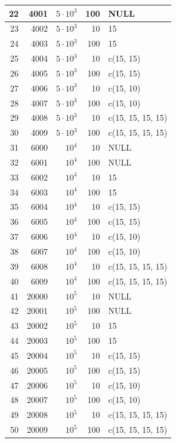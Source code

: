 \documentclass[11pt]{report}
\begin{document}
\begin{longtable}{|r|r|r|r|l|}
\hline
22 & 4001 & $5 \cdot 10^3$ & 100 & NULL \\ 
\hline
23 & 4002 & $5 \cdot 10^3$ & 10 & 15 \\ 
\hline
24 & 4003 & $5 \cdot 10^3$ & 100 & 15 \\ 
\hline
25 & 4004 & $5 \cdot 10^3$ & 10 & c(15, 15) \\ 
\hline
26 & 4005 & $5 \cdot 10^3$ & 100 & c(15, 15) \\ 
\hline
27 & 4006 & $5 \cdot 10^3$ & 10 & c(15, 10) \\ 
\hline
28 & 4007 & $5 \cdot 10^3$ & 100 & c(15, 10) \\ 
\hline
29 & 4008 & $5 \cdot 10^3$ & 10 & c(15, 15, 15, 15) \\
\hline
30 & 4009 & $5 \cdot 10^3$ & 100 & c(15, 15, 15, 15) \\ 
\hline
\hline
31 & 6000 & $10^4$ & 10 & NULL \\ 
\hline
32 & 6001 & $10^4$ & 100 & NULL \\ 
\hline
33 & 6002 & $10^4$ & 10 & 15 \\ 
\hline
34 & 6003 & $10^4$ & 100 & 15 \\ 
\hline
35 & 6004 & $10^4$ & 10 & c(15, 15) \\ 
\hline
36 & 6005 & $10^4$ & 100 & c(15, 15) \\ 
\hline
37 & 6006 & $10^4$ & 10 & c(15, 10) \\ 
\hline
38 & 6007 & $10^4$ & 100 & c(15, 10) \\ 
\hline
39 & 6008 & $10^4$ & 10 & c(15, 15, 15, 15) \\ 
\hline
40 & 6009 & $10^4$ & 100 & c(15, 15, 15, 15) \\ 
\hline
\hline
41 & 20000 & $10^5$ & 10 & NULL \\ 
\hline
42 & 20001 & $10^5$ & 100 & NULL \\ 
\hline
43 & 20002 & $10^5$ & 10 & 15 \\
\hline
44 & 20003 & $10^5$ & 100 & 15 \\ 
\hline
45 & 20004 & $10^5$ & 10 & c(15, 15) \\ 
\hline
46 & 20005 & $10^5$ & 100 & c(15, 15) \\ 
\hline
47 & 20006 & $10^5$ & 10 & c(15, 10) \\ 
\hline
48 & 20007 & $10^5$ & 100 & c(15, 10) \\ 
\hline
49 & 20008 & $10^5$ & 10 & c(15, 15, 15, 15) \\ 
\hline
50 & 20009 & $10^5$ & 100 & c(15, 15, 15, 15) \\ 

\end{longtable}
\end{document}
